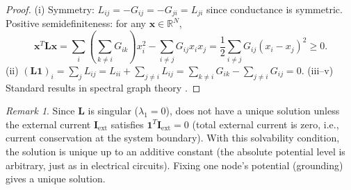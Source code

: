 \documentclass[twocolumn,10pt,a4paper]{article}
\theoremstyle{definition}
\theoremstyle{remark}
\newtheorem{remark}[theorem]{Remark}
\newcommand{\R}{\mathbb{R}}
\newcommand{\vect}[1]{\boldsymbol{#1}}
\newcommand{\mat}[1]{\mathbf{#1}}
\begin{document}
\begin{proof}
(i) Symmetry: $L_{ij} = -G_{ij} = -G_{ji} = L_{ji}$ since conductance is symmetric. Positive semidefiniteness: for any $\vect{x} \in \R^N$,
\begin{equation}
\vect{x}^T \mat{L} \vect{x} = \sum_{i} \left(\sum_{k \neq i} G_{ik}\right) x_i^2 - \sum_{i \neq j} G_{ij} x_i x_j = \frac{1}{2} \sum_{i \neq j} G_{ij}(x_i - x_j)^2 \geq 0.
\end{equation}
(ii) $(\mat{L}\vect{1})_i = \sum_j L_{ij} = L_{ii} + \sum_{j \neq i} L_{ij} = \sum_{k \neq i} G_{ik} - \sum_{j \neq i} G_{ij} = 0$.
(iii--v) Standard results in spectral graph theory \citep{Chung1997, Bollobas1998}.
\end{proof}

\begin{remark}
Since $\mat{L}$ is singular ($\lambda_1 = 0$),  does not have a unique solution unless the external current $\vect{I}_{\mathrm{ext}}$ satisfies $\vect{1}^T \vect{I}_{\mathrm{ext}} = 0$ (total external current is zero, i.e., current conservation at the system boundary). With this solvability condition, the solution is unique up to an additive constant (the absolute potential level is arbitrary, just as in electrical circuits). Fixing one node's potential (grounding) gives a unique solution.
\end{remark}
\end{document}
